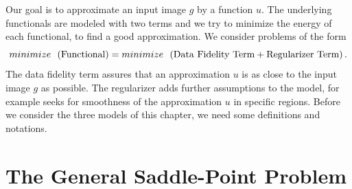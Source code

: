\documentclass[abstracton]{scrreprt}
\begin{document}
    Our goal is to approximate an input image $g$ by a function $u$. The underlying functionals are modeled with two terms and we try to minimize the energy of each functional, to find a good approximation. We consider problems of the form
        $$
            minimize \,\,\, \left( \textnormal{Functional} \right) = minimize \,\,\, \left( \textnormal{Data Fidelity Term} + \textnormal{Regularizer Term} \right).
        $$
    The data fidelity term assures that an approximation $u$ is as close to the input image $g$ as possible. The regularizer adds further assumptions to the model, for example seeks for smoothness of the approximation $u$ in specific regions. Before we consider the three models of this chapter, we need some definitions and notations.

    \section{The General Saddle-Point Problem} %
    \label{sec:the_general_saddle_point_problem}
        
\end{document}
